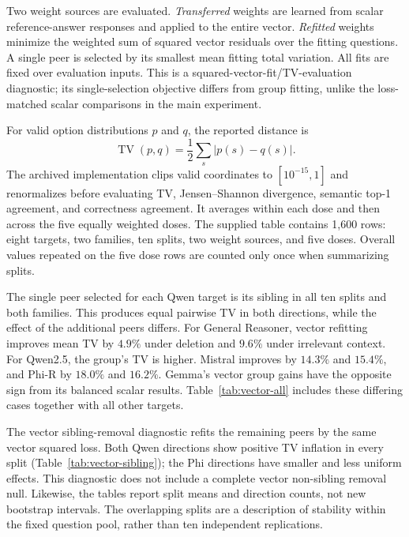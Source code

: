 Two weight sources are evaluated. \emph{Transferred} weights are learned from scalar reference-answer responses and applied to the entire vector. \emph{Refitted} weights minimize the weighted sum of squared vector residuals over the fitting questions. A single peer is selected by its smallest mean fitting total variation. All fits are fixed over evaluation inputs. This is a squared-vector-fit/TV-evaluation diagnostic; its single-selection objective differs from group fitting, unlike the loss-matched scalar comparisons in the main experiment.

For valid option distributions $p$ and $q$, the reported distance is
\begin{equation}
\operatorname{TV}(p,q)=\frac12\sum_s|p(s)-q(s)|.
\end{equation}
The archived implementation clips valid coordinates to $[10^{-15},1]$ and renormalizes before evaluating TV, Jensen--Shannon divergence, semantic top-1 agreement, and correctness agreement. It averages within each dose and then across the five equally weighted doses. The supplied table contains 1,600 rows: eight targets, two families, ten splits, two weight sources, and five doses. Overall values repeated on the five dose rows are counted only once when summarizing splits.



The single peer selected for each Qwen target is its sibling in all ten splits and both families. This produces equal pairwise TV in both directions, while the effect of the additional peers differs. For General Reasoner, vector refitting improves mean TV by $4.9\%$ under deletion and $9.6\%$ under irrelevant context. For Qwen2.5, the group's TV is higher. Mistral improves by $14.3\%$ and $15.4\%$, and Phi-R by $18.0\%$ and $16.2\%$. Gemma's vector group gains have the opposite sign from its balanced scalar results. Table~\ref{tab:vector-all} includes these differing cases together with all other targets.

The vector sibling-removal diagnostic refits the remaining peers by the same vector squared loss. Both Qwen directions show positive TV inflation in every split (Table~\ref{tab:vector-sibling}); the Phi directions have smaller and less uniform effects. This diagnostic does not include a complete vector non-sibling removal null. Likewise, the tables report split means and direction counts, not new bootstrap intervals. The overlapping splits are a description of stability within the fixed question pool, rather than ten independent replications.

